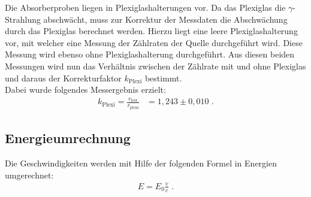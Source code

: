 Die Absorberproben liegen in Plexiglashalterungen vor. Da das Plexiglas die $\gamma$-Strahlung abschwächt, muss zur Korrektur der Messdaten die Abschwächung durch das Plexiglas berechnet werden. Hierzu liegt eine leere Plexiglashalterung vor, mit welcher eine Messung der Zählraten der Quelle durchgeführt wird. Diese Messung wird ebenso ohne Plexiglashalterung durchgeführt. Aus diesen beiden Messungen wird nun das Verhältnis zwischen der Zählrate mit und ohne Plexiglas und daraus der Korrekturfaktor $k_\text{Plexi}$ bestimmt.\\

Dabei wurde folgendes Messergebnis erzielt:
\begin{align}
	k_\text{Plexi}=\frac{r_\text{leer}}{r_\text{plexi}}&=1,243\pm0,010\text{ .}
\end{align}

\subsection{Energieumrechnung}
Die Geschwindigkeiten werden mit Hilfe der folgenden Formel in Energien umgerechnet:
\begin{align}
	E=E_0\frac{v}{c}\text{ .}\label{vtoE}
\end{align}

